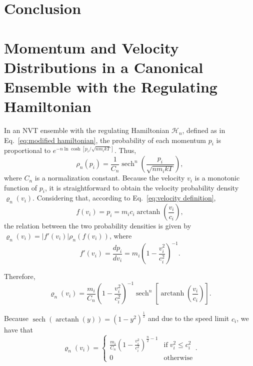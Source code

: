 \documentclass[
aip,
jcp,
reprint,
]{revtex4-1}
\DeclareMathOperator\arctanh{arctanh}
\DeclareMathOperator\sech{sech}
\newcommand{\nn}{n}
\begin{document}
\section{Conclusion}

\appendix

\section{Momentum and Velocity Distributions in a Canonical Ensemble with the Regulating Hamiltonian}
\label{sec:momentum and velocity distributions}

In an NVT ensemble with the regulating Hamiltonian ${\mathcal H}_\nn$, defined as in Eq.~\eqref{eq:modified hamiltonian}, the probability of each momentum $p_i$ is proportional to $e^{-\nn\ln\cosh\left[p_i/\sqrt{\nn m_i k T}\right]}$.
Thus,
\begin{equation*}
\rho_\nn(p_i) = \frac{1}{C_\nn} \sech^\nn\left(\frac{p_i}{\sqrt{\nn m_i k T}}\right),
\end{equation*}
where $C_\nn$ is a normalization constant.
Because the velocity $v_i$ is a monotonic function of $p_i$, it is straightforward to obtain the velocity probability density $\varrho_\nn(v_i)$.
Considering that, according to Eq.~\eqref{eq:velocity definition},
\begin{equation*}
f(v_i) = p_i = m_i c_i \arctanh\left(\frac{v_i}{c_i}\right),
\end{equation*}
the relation between the two probability densities is given by $\varrho_\nn(v_i) = |f'(v_i)| \rho_\nn\left(f(v_i)\right)$, where
\begin{equation*}
f'(v_i) = \frac{dp_i}{d v_i} = m_i \left(1-\frac{v_i^2}{c_i^2}\right)^{-1}.
\end{equation*}

Therefore,
\begin{equation*}
\varrho_\nn(v_i) = \frac{m_i}{C_\nn} \left(1-\frac{v_i^2}{c_i^2}\right)^{-1} \sech^\nn\left[\arctanh\left(\frac{v_i}{c_i}\right)\right].
\end{equation*}

Because $\sech(\arctanh(y)) = (1-y^2)^\frac{1}{2}$ and due to the speed limit $c_i$, we have that
\begin{equation*}
\varrho_\nn(v_i) = \begin{cases}
\frac{m_i}{C_\nn} \left(1-\frac{v_i^2}{c_i^2}\right)^{\frac{\nn}{2}-1} & \mathrm{if} \; v_i^2 \leq c_i^2 \\
0 & \mathrm{otherwise}
\end{cases}.
\end{equation*}
\end{document}

